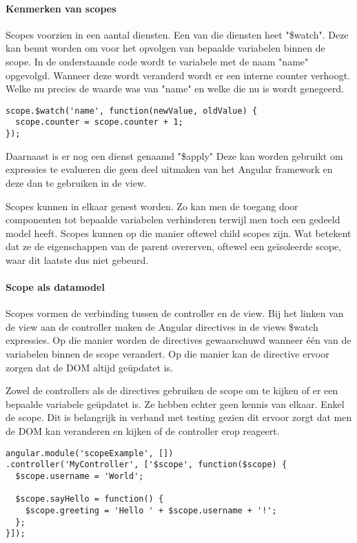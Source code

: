 \documentclass[a4paper,11pt]{article}
\begin{document}
\paragraph{Kenmerken van scopes}
Scopes voorzien in een aantal diensten. Een van die diensten heet "\$watch". Deze kan benut worden om voor het opvolgen van bepaalde variabelen binnen de scope. In de onderstaande code wordt te variabele met de naam "name" opgevolgd. Wanneer deze wordt veranderd wordt er een interne counter verhoogt. Welke nu precies de waarde was van "name" en welke die nu is wordt genegeerd.
\begin{lstlisting}
scope.$watch('name', function(newValue, oldValue) {
  scope.counter = scope.counter + 1;
});
\end{lstlisting}

Daarnaast is er nog een dienst genaamd "\$apply" Deze kan worden gebruikt om expressies te evalueren die geen deel uitmaken van het Angular framework en deze dan te gebruiken in de view.

Scopes kunnen in elkaar genest worden. Zo kan men de toegang door componenten tot bepaalde variabelen verhinderen terwijl men toch een gedeeld model heeft. Scopes kunnen op die manier oftewel child scopes zijn. Wat betekent dat ze de eigenschappen van de parent overerven, oftewel een geïsoleerde scope, waar dit laatste dus niet gebeurd.

\paragraph{Scope als datamodel}
Scopes vormen de verbinding tussen de controller en de view. Bij het linken van de view aan de controller maken de Angular directives in de views \$watch expressies. Op die manier worden de directives gewaarschuwd wanneer één van de variabelen binnen de scope verandert. Op die manier kan de directive ervoor zorgen dat de DOM altijd geüpdatet is.

Zowel de controllers als de directives gebruiken de scope om te kijken of er een bepaalde variabele geüpdatet is. Ze hebben echter geen kennis van elkaar. Enkel de scope. Dit is belangrijk in verband met testing gezien dit ervoor zorgt dat men de DOM kan veranderen en kijken of de controller erop reageert.

\begin{lstlisting}
angular.module('scopeExample', [])
.controller('MyController', ['$scope', function($scope) {
  $scope.username = 'World';

  $scope.sayHello = function() {
    $scope.greeting = 'Hello ' + $scope.username + '!';
  };
}]);
\end{lstlisting}
\end{document}
